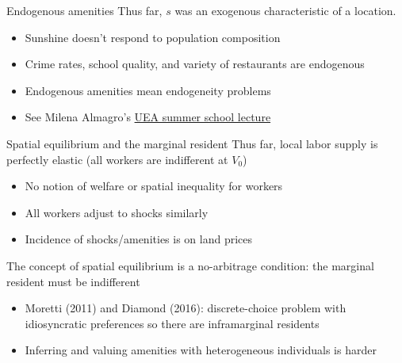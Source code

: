 \documentclass[11pt,notes=hide,aspectratio=169]{beamer}
\begin{document}
\begin{frame}{Endogenous amenities}
Thus far, $s$ was an exogenous characteristic of a location.
\begin{itemize}
\item Sunshine doesn't respond to population composition
\item Crime rates, school quality, and variety of restaurants are endogenous
\item Endogenous amenities mean endogeneity problems
\item See Milena Almagro's \href{https://m-almagro.github.io/UEA_Summer_School_2023.pdf}{UEA summer school lecture}
\end{itemize}
\end{frame}
\begin{frame}{Spatial equilibrium and the marginal resident}
Thus far, local labor supply is perfectly elastic
(all workers are indifferent at $V_0$)
\begin{itemize}
\item No notion of welfare or spatial inequality for workers
\item All workers adjust to shocks similarly
\item Incidence of shocks/amenities is on land prices
\end{itemize}
\medskip
The concept of spatial equilibrium is a no-arbitrage condition:
the marginal resident must be indifferent
\begin{itemize}
\item Moretti (2011) and Diamond (2016): discrete-choice problem with idiosyncratic preferences so there are inframarginal residents
\item Inferring and valuing amenities with heterogeneous individuals is harder
\end{itemize}
\end{frame}
\end{document}

